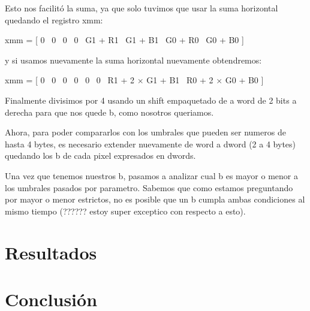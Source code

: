 \documentclass[a4paper]{article}
\begin{document}
Esto nos facilit\'o la suma, ya que solo tuvimos que usar la suma horizontal quedando el registro xmm:

\begin{center}
	xmm = [ 0 \textpipe\ 0 \textpipe\ 0 \textpipe\ 0 \textpipe\ G1 + R1 \textpipe\ G1 + B1 \textpipe\ G0 + R0 \textpipe\ G0 + B0 ]
\end{center}

y si usamos nuevamente la suma horizontal nuevamente obtendremos:

\begin{center}
	xmm = [ 0 \textpipe\ 0 \textpipe\ 0 \textpipe\ 0 \textpipe\ 0 \textpipe\ 0 \textpipe\ R1 + 2 $\times$ G1 + B1 \textpipe\ R0 + 2 $\times$ G0 + B0 ]
\end{center}

Finalmente divisimos por 4 usando un shift empaquetado de a word de 2 bits a derecha para que nos quede b, como nosotros queriamos.

Ahora, para poder compararlos con los umbrales que pueden ser numeros de hasta 4 bytes, es necesario extender nuevamente de word a dword (2 a 4 bytes) quedando los b de cada pixel expresados en dwords.

Una vez que tenemos nuestros b, pasamos a analizar cual b es mayor o menor a los umbrales pasados por parametro. Sabemos que como estamos preguntando por mayor o menor estrictos, no es posible que un b cumpla ambas condiciones al mismo tiempo (?????? estoy super exceptico con respecto a esto).

\section{Resultados}
%

\section{Conclusión}
\end{document}
